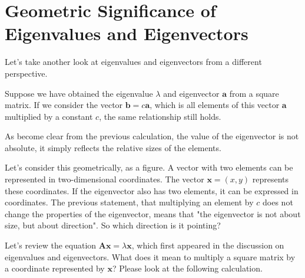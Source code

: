 \documentclass{ltjsbook}
\begin{document}
\section{Geometric Significance of Eigenvalues and Eigenvectors}

Let's take another look at eigenvalues and eigenvectors from a different perspective.

Suppose we have obtained the eigenvalue $\lambda$ and eigenvector $\bm{a}$ from a square matrix. If we consider the vector $\bm{b}=c\bm{a}$, which is all elements of this vector $\bm{a}$ multiplied by a constant $c$, the same relationship still holds.

As become clear from the previous calculation, the value of the eigenvector is not absolute, it simply reflects the relative sizes of the elements.

Let's consider this geometrically, as a figure. A vector with two elements can be represented in two-dimensional coordinates. The vector $\bm{x}=(x,y)$ represents these coordinates. If the eigenvector also has two elements, it can be expressed in coordinates. The previous statement, that multiplying an element by $c$ does not change the properties of the eigenvector, means that "the eigenvector is not about size, but about direction". So which direction is it pointing?

Let's review the equation $\bm{Ax}=\lambda\bm{x}$, which first appeared in the discussion on eigenvalues and eigenvectors. What does it mean to multiply a square matrix by a coordinate represented by $\bm{x}$? Please look at the following calculation.

\end{document}
